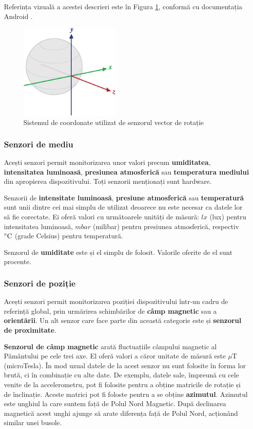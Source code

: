 \documentclass[12pt,a4paper]{article}
\begin{document}
	Referința vizuală a acestei descrieri este în Figura \ref{fig:axis_globe}, conformă cu documentația Android \cite{DeveloperAndroid}.

\begin{figure}[h]
\centering
\includegraphics[width=5cm]{figures/axis_globe.png}
\caption{Sistemul de coordonate utilizat de senzorul vector de rotație}
\label{fig:axis_globe}
\end{figure}

\subsubsection{Senzori de mediu}
Acești senzori permit monitorizarea unor valori precum \textbf{umiditatea}, \textbf{intensitatea luminoasă}, \textbf{presiunea atmosferică} sau \textbf{temperatura mediului} din apropierea dispozitivului. Toți senzorii menționați sunt hardware.

Senzorii de \textbf{intensitate luminoasă}, \textbf{presiune atmosferică} sau \textbf{temperatură} sunt unii dintre cei mai simplu de utilizat deoarece nu este necesar ca datele lor să fie corectate. Ei oferă valori cu următoarele unități de măsură: $lx$ (lux) pentru intensitatea luminoasă, $mbar$ (milibar) pentru presiunea atmosferică, respectiv $\celsius$ (grade Celsius) pentru temperatură.

Senzorul de \textbf{umiditate} este și el simplu de folosit. Valorile oferite de el sunt procente.


\subsubsection{Senzori de poziție}
Acești senzori permit monitorizarea poziției dispozitivului într-un cadru de referință global, prin urmărirea schimbărilor de \textbf{câmp magnetic} sau a \textbf{orientării}. Un alt senzor care face parte din această categorie este și  \textbf{senzorul de proximitate}.

\textbf{Senzorul de câmp magnetic} arată fluctuațiile câmpului magnetic al Pământului pe cele trei axe. El oferă valori a căror unitate de măsură este $\mu$T (microTesla). În mod uzual datele de la acest senzor nu sunt folosite în forma lor brută, ci în combinație cu alte date. De exemplu, datele sale, împreună cu cele venite de la accelerometru, pot fi folosite pentru a obține matricile de rotație și de înclinație. Aceste matrici pot fi foloste pentru a se obține \textbf{azimutul}. Azimutul este unghiul la care suntem față de Polul Nord Magnetic. După declinarea magnetică acest unghi ajunge să arate diferența față de Polul Nord, acționând similar unei busole.
\end{document}
